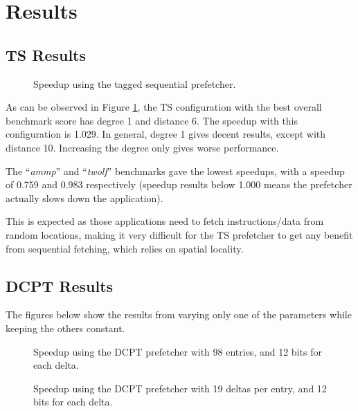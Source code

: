 \section{Results}
\label{sec:res}

\subsection{TS Results}

\begin{figure}[h]
    \begin{centering}
        
        \caption{Speedup using the tagged sequential prefetcher.}
        \label{figure:ts}
    \end{centering}
\end{figure}

As can be observed in Figure \ref{figure:ts}, the TS configuration with the best
overall benchmark score has degree 1 and distance 6. The speedup with this configuration is 1.029.
In general, degree 1 gives decent results, except with distance 10. Increasing the degree only gives worse performance.

The ``\emph{ammp}'' and ``\emph{twolf}'' benchmarks
gave the lowest speedups, with a speedup of 0.759 and 0.983 respectively (speedup
results below 1.000 means the prefetcher actually slows down the application).

This is expected as those applications need to fetch instructions/data from
random locations, making it very difficult for the TS prefetcher
to get any benefit from sequential fetching, which relies on spatial locality.

\subsection{DCPT Results}

The figures below show the results from varying only one of the parameters while keeping the others constant.
\begin{figure}[h]
    \begin{centering}
        
        \caption{Speedup using the DCPT prefetcher with 98 entries, and 12 bits for each delta.}
        \label{figure:dcpt-num-deltas}
    \end{centering}
\end{figure}

\begin{figure}[h]
    \begin{centering}
        
        \caption{Speedup using the DCPT prefetcher with 19 deltas per entry, and 12 bits for each delta.}
        \label{figure:dcpt-table-size}
    \end{centering}
\end{figure}


